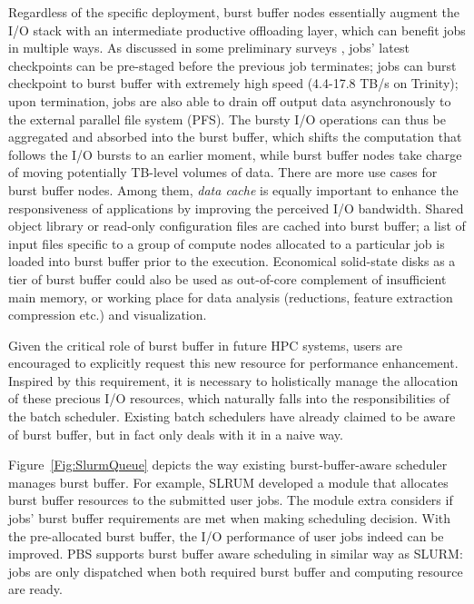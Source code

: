 Regardless of the specific deployment, burst buffer nodes essentially augment
the I/O stack with an intermediate productive offloading layer, 
which can benefit jobs in multiple ways.
As discussed in some preliminary surveys\cite{apex-workflow} ,
jobs' latest checkpoints can be pre-staged
before the previous job terminates;
jobs can burst checkpoint to burst buffer
with extremely high speed (4.4-17.8 TB/s on Trinity);
upon termination, jobs are also able to drain off output data
asynchronously to the external parallel file system (PFS).
The bursty I/O operations can thus be aggregated and absorbed into the burst buffer,
which shifts the computation that follows the I/O bursts to an earlier moment,
while burst buffer nodes take charge of moving potentially TB-level volumes of data.
There are more use cases for burst buffer nodes.
Among them, \textit{data cache} is equally important to enhance the responsiveness
of applications by improving the perceived I/O bandwidth\cite{TrinitySystem}.
Shared object library or read-only configuration files are cached into burst buffer;
a list of input files specific to a group of compute nodes allocated to
a particular job is loaded into burst buffer prior to the execution.
Economical solid-state disks as a tier of burst buffer could also be used as
out-of-core complement of insufficient main memory\cite{Romanus:CORR:15},
or working place for data analysis (reductions, feature extraction compression etc.)
and visualization\cite{TrinitySystem}.

Given the critical role of burst buffer in future HPC systems,
users are encouraged to explicitly request this new resource for performance enhancement\cite{apex-workflow}.
Inspired by this requirement, it is necessary to holistically manage
the allocation of these precious I/O resources,
which naturally falls into the responsibilities of the batch scheduler.
Existing batch schedulers \cite{Moab, Cobalt, SlurmBBGuide, PBSonCRAY} have already claimed to
be aware of burst buffer, but in fact only deals with it in a naive way.

Figure~\ref{Fig:SlurmQueue} depicts the way existing burst-buffer-aware scheduler manages burst buffer.
For example, SLRUM developed a module that allocates burst buffer resources to the submitted user jobs.
The module extra considers if jobs' burst buffer requirements are met when making scheduling decision.
With the pre-allocated burst buffer,
the I/O performance of user jobs indeed can be improved\cite{SlurmBBGuide}.
PBS supports burst buffer aware scheduling in similar way as SLURM:
jobs are only dispatched when both required burst buffer and computing resource are ready\cite{PBSonCRAY}.

